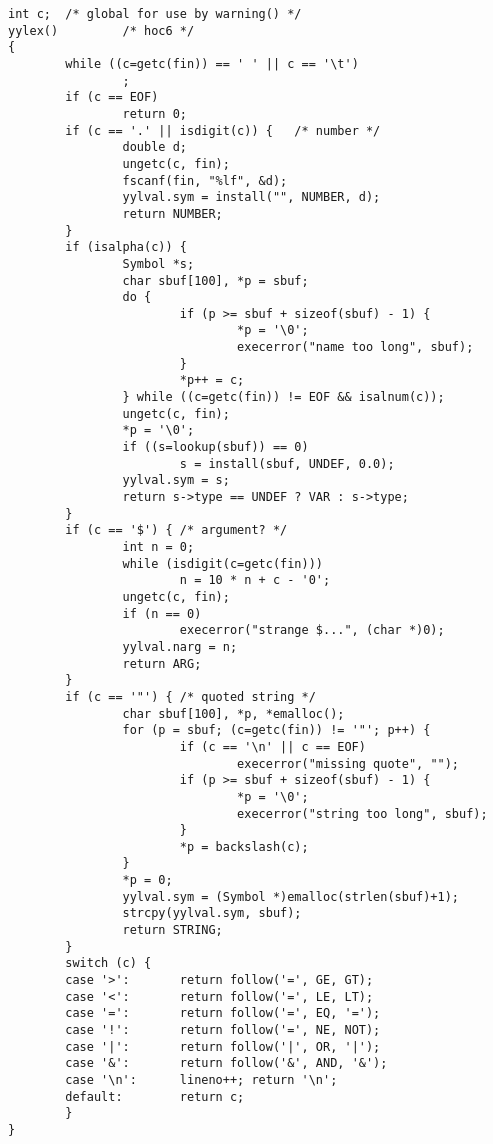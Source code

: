 \begin{verbatim}
int c;  /* global for use by warning() */
yylex()         /* hoc6 */
{
        while ((c=getc(fin)) == ' ' || c == '\t')
                ;
        if (c == EOF)
                return 0;
        if (c == '.' || isdigit(c)) {   /* number */
                double d;
                ungetc(c, fin);
                fscanf(fin, "%lf", &d);
                yylval.sym = install("", NUMBER, d);
                return NUMBER;
        }
        if (isalpha(c)) {
                Symbol *s;
                char sbuf[100], *p = sbuf;
                do {
                        if (p >= sbuf + sizeof(sbuf) - 1) {
                                *p = '\0';
                                execerror("name too long", sbuf);
                        }
                        *p++ = c;
                } while ((c=getc(fin)) != EOF && isalnum(c));
                ungetc(c, fin);
                *p = '\0';
                if ((s=lookup(sbuf)) == 0)
                        s = install(sbuf, UNDEF, 0.0);
                yylval.sym = s;
                return s->type == UNDEF ? VAR : s->type;
        }
        if (c == '$') { /* argument? */
                int n = 0;
                while (isdigit(c=getc(fin)))
                        n = 10 * n + c - '0';
                ungetc(c, fin);
                if (n == 0)
                        execerror("strange $...", (char *)0);
                yylval.narg = n;
                return ARG;
        }
        if (c == '"') { /* quoted string */
                char sbuf[100], *p, *emalloc();
                for (p = sbuf; (c=getc(fin)) != '"'; p++) {
                        if (c == '\n' || c == EOF)
                                execerror("missing quote", "");
                        if (p >= sbuf + sizeof(sbuf) - 1) {
                                *p = '\0';
                                execerror("string too long", sbuf);
                        }
                        *p = backslash(c);
                }
                *p = 0;
                yylval.sym = (Symbol *)emalloc(strlen(sbuf)+1);
                strcpy(yylval.sym, sbuf);
                return STRING;
        }
        switch (c) {
        case '>':       return follow('=', GE, GT);
        case '<':       return follow('=', LE, LT);
        case '=':       return follow('=', EQ, '=');
        case '!':       return follow('=', NE, NOT);
        case '|':       return follow('|', OR, '|');
        case '&':       return follow('&', AND, '&');
        case '\n':      lineno++; return '\n';
        default:        return c;
        }
}


\end{verbatim}
